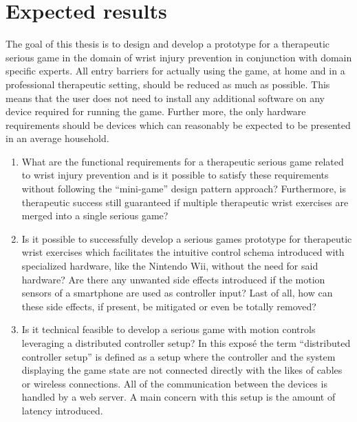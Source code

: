 \section{Expected results}

The goal of this thesis is to design and develop a prototype for a therapeutic serious game in the domain of wrist injury prevention in conjunction with domain specific experts. 
All entry barriers for actually using the game, at home and in a professional therapeutic setting, should be reduced as much as possible. 
This means that the user does not need to install any additional software on any device required for running the game. 
Further more, the only hardware requirements should be devices which can reasonably be expected to be presented in an average household. 

\begin{enumerate}
	\item What are the functional requirements for a therapeutic serious game related to wrist injury prevention and is it possible to satisfy these requirements without following the “mini-game” design pattern approach? Furthermore, is therapeutic success still guaranteed if multiple therapeutic wrist exercises are merged into a single serious game?
	\item Is it possible to successfully develop a serious games prototype for therapeutic wrist exercises which facilitates the intuitive control schema introduced with specialized hardware, like the Nintendo Wii, without the need for said hardware? Are there any unwanted side effects introduced if the motion sensors of a smartphone are used as controller input? Last of all, how can these side effects, if present, be mitigated or even be totally removed?
	\item Is it technical feasible to develop a serious game with motion controls leveraging a distributed controller setup? In this exposé the term “distributed controller setup” is defined as a setup where the controller and the system displaying the game state are not connected directly with the likes of cables or wireless connections. All of the communication between the devices is handled by a web server. A main concern with this setup is the amount of latency introduced.
\end{enumerate}


